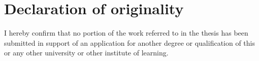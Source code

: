 
\cleardoublepage

{}

\chapter*{Declaration of originality}

I hereby confirm that no portion of the work referred to in the thesis has been submitted in support of an application for another degree or qualification of this or any other university or other institute of learning.
